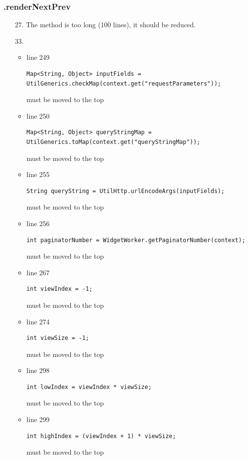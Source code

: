 \documentclass[english]{article}
\begin{document}
\subsubsection*{.renderNextPrev}
	\begin{itemize}
	\item[27.]{The method is too long (100 lines), it should be reduced.
}	
		\item[33.]{ 
			\begin{itemize}
				\item{line 249
						\begin{lstlisting}
Map<String, Object> inputFields = UtilGenerics.checkMap(context.get("requestParameters"));
						\end{lstlisting} must be moved to the top}
				\item{line 250
						\begin{lstlisting}
Map<String, Object> queryStringMap = UtilGenerics.toMap(context.get("queryStringMap"));
						\end{lstlisting} must be moved to the top}
				\item{line 255
						\begin{lstlisting}
String queryString = UtilHttp.urlEncodeArgs(inputFields);
						\end{lstlisting} must be moved to the top}
				\item{line 256
						\begin{lstlisting}
int paginatorNumber = WidgetWorker.getPaginatorNumber(context);
						\end{lstlisting} must be moved to the top}
				\item{line 267
						\begin{lstlisting}
int viewIndex = -1;
						\end{lstlisting} must be moved to the top}
				\item{line 274
						\begin{lstlisting}
int viewSize = -1;
						\end{lstlisting} must be moved to the top}
				\item{line 298
						\begin{lstlisting}
int lowIndex = viewIndex * viewSize;
						\end{lstlisting} must be moved to the top}
				\item{line 299
						\begin{lstlisting}
int highIndex = (viewIndex + 1) * viewSize;
						\end{lstlisting} must be moved to the top}

\end{itemize}}
\end{itemize}
\end{document}
